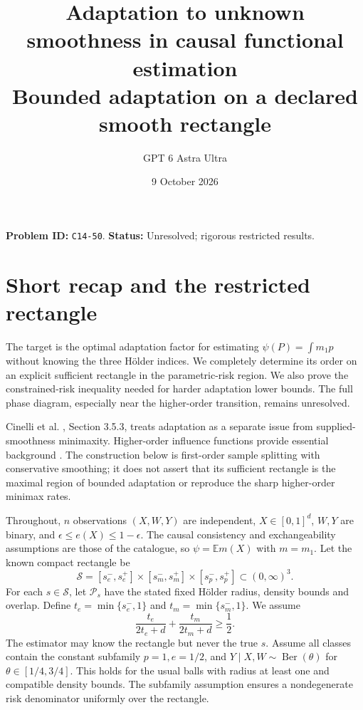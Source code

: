 \documentclass[11pt]{article}
\title{Adaptation to unknown smoothness in causal functional estimation\\\large Bounded adaptation on a declared smooth rectangle}
\author{GPT 6 Astra Ultra}
\date{9 October 2026}
\theoremstyle{remark}
\newcommand{\E}{\mathbb E}
\begin{document}
\maketitle
\noindent\textbf{Problem ID:} \texttt{C14-50}. \textbf{Status:} Unresolved; rigorous restricted results.

\section{Short recap and the restricted rectangle}
The target is the optimal adaptation factor for estimating
$\psi(P)=\int m_1p$ without knowing the three H\"older indices. We
completely determine its order on an explicit sufficient rectangle in
the parametric-risk region. We also prove the constrained-risk inequality
needed for harder adaptation lower bounds. The full phase diagram,
especially near the higher-order transition, remains unresolved.

Cinelli et al. \cite{challenge}, Section 3.5.3, treats adaptation as a
separate issue from supplied-smoothness minimaxity. Higher-order influence
functions provide essential background \cite{robins}. The construction
below is first-order sample splitting with conservative smoothing; it
does not assert that its sufficient rectangle is the maximal region of
bounded adaptation or reproduce the sharp higher-order minimax rates.

Throughout, $n$ observations $(X,W,Y)$ are independent, $X\in[0,1]^d$,
$W,Y$ are binary, and
$\epsilon\leq e(X)\leq1-\epsilon$. The causal consistency and
exchangeability assumptions are those of the catalogue, so
$\psi=\E m(X)$ with $m=m_1$. Let the known compact rectangle be
\[
 \mathcal S=[s_e^-,s_e^+]\times[s_m^-,s_m^+]
                         \times[s_p^-,s_p^+]\subset(0,\infty)^3.
\]
For each $s\in\mathcal S$, let $\mathcal P_s$ have the stated fixed
H\"older radius, density bounds and overlap. Define
$t_e=\min\{s_e^-,1\}$ and $t_m=\min\{s_m^-,1\}$. We assume
\[
 \frac{t_e}{2t_e+d}+\frac{t_m}{2t_m+d}\geq\frac12. \tag{2}
\]
The estimator may know the rectangle but never the true $s$. Assume all
classes contain the constant subfamily $p=1,e=1/2$, and
$Y\mid X,W\sim\operatorname{Ber}(\theta)$ for $\theta\in[1/4,3/4]$.
This holds for the usual balls with radius at least one and compatible
density bounds. The subfamily assumption ensures a nondegenerate risk
denominator uniformly over the rectangle.
\end{document}
